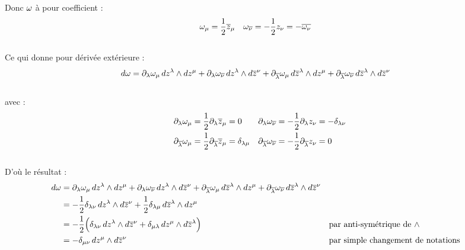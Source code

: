 Donc $\omega$ à pour coefficient :
\begin{align} \label{eq:sym2conn}
	\omega_\mu &= \frac{1}{2} \overline{z}_\mu  &  \omega_{\overline{\nu}} &= - \frac{1}{2} z_\nu = -\overline{\omega_\nu}
\end{align}
\\
Ce qui donne pour dérivée extérieure :
\begin{align*}
	d\omega &= \partial_\lambda\omega_\mu\, dz^\lambda \wedge dz^\mu 
	+ \partial_\lambda\omega_{\overline{\nu}}\, dz^\lambda \wedge d\overline{z}^\nu
	+ \partial_{\overline{\lambda}}\omega_\mu\, d\overline{z}^\lambda \wedge dz^\mu 
	+ \partial_{\overline{\lambda}}\omega_{\overline{\nu}}\, d\overline{z}^\lambda \wedge d\overline{z}^\nu
\end{align*}
\\
avec :
\begin{align*}
	\partial_\lambda \omega_\mu &= \frac{1}{2}\partial_\lambda \overline{z}_\mu = 0   &
	\partial_\lambda\omega_{\overline{\nu}} &= -\frac{1}{2}\partial_\lambda z_\nu = -\delta_{\lambda \nu} \\
	\partial_{\overline{\lambda}}\omega_\mu &= \frac{1}{2}\partial_{\overline{\lambda}} \overline{z}_\mu = \delta_{\lambda \mu}  &
	\partial_{\overline{\lambda}} \omega_{\overline{\nu}} &= -\frac{1}{2}\partial_{\overline{\lambda}} z_\nu = 0
\end{align*}
\\
D'où le résultat :
\begin{align*}
	d\omega &= \partial_\lambda\omega_\mu\, dz^\lambda \wedge dz^\mu 
	+ \partial_\lambda\omega_{\overline{\nu}}\, dz^\lambda \wedge d\overline{z}^\nu
	+ \partial_{\overline{\lambda}}\omega_\mu\, d\overline{z}^\lambda \wedge dz^\mu 
	+ \partial_{\overline{\lambda}}\omega_{\overline{\nu}}\, d\overline{z}^\lambda \wedge d\overline{z}^\nu \\
	&= -\frac{1}{2}\delta_{\lambda \nu}\, dz^\lambda \wedge d\overline{z}^\nu
	+ \frac{1}{2}\delta_{\lambda \mu}\, d\overline{z}^\lambda \wedge dz^\mu \\
	&= -\frac{1}{2}\Big( \delta_{\lambda \nu}\, dz^\lambda \wedge d\overline{z}^\nu + \delta_{\mu \lambda}\, dz^\mu \wedge d\overline{z}^\lambda \Big)  &  &\text{par anti-symétrique de $\wedge$}\\
	&= -\delta_{\mu \nu}\, dz^\mu \wedge d\overline{z}^\nu  &  &\text{par simple changement de notations}
\end{align*}
\skipl

